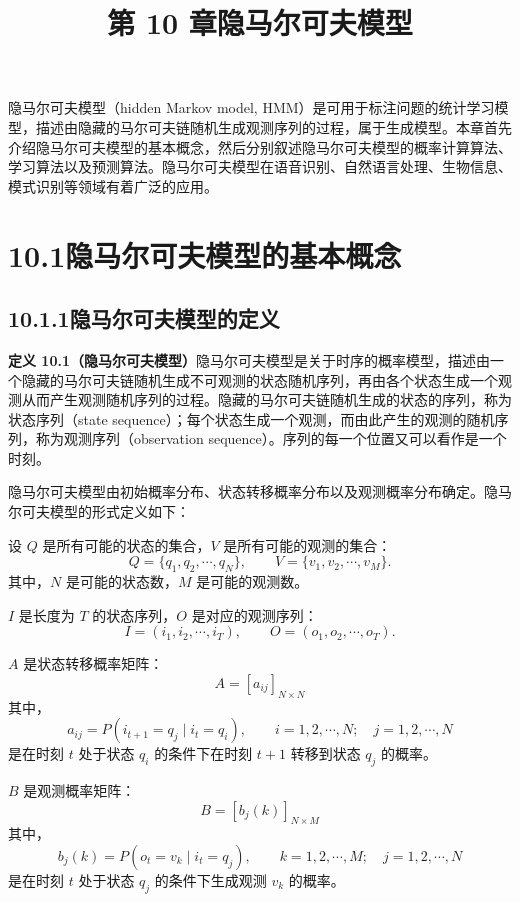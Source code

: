 \documentclass[UTF8,12pt,a4paper,fontset=fandol]{ctexart}
\title{第 10 章\quad 隐马尔可夫模型}
\author{}
\date{}
\begin{document}
\maketitle

隐马尔可夫模型（hidden Markov model, HMM）是可用于标注问题的统计学习模型，描述由隐藏的马尔可夫链随机生成观测序列的过程，属于生成模型。本章首先介绍隐马尔可夫模型的基本概念，然后分别叙述隐马尔可夫模型的概率计算算法、学习算法以及预测算法。隐马尔可夫模型在语音识别、自然语言处理、生物信息、模式识别等领域有着广泛的应用。

\section*{10.1\quad 隐马尔可夫模型的基本概念}

\subsection*{10.1.1\quad 隐马尔可夫模型的定义}

\noindent\textbf{定义 10.1（隐马尔可夫模型）}\quad 隐马尔可夫模型是关于时序的概率模型，描述由一个隐藏的马尔可夫链随机生成不可观测的状态随机序列，再由各个状态生成一个观测从而产生观测随机序列的过程。隐藏的马尔可夫链随机生成的状态的序列，称为状态序列（state sequence）；每个状态生成一个观测，而由此产生的观测的随机序列，称为观测序列（observation sequence）。序列的每一个位置又可以看作是一个时刻。

隐马尔可夫模型由初始概率分布、状态转移概率分布以及观测概率分布确定。隐马尔可夫模型的形式定义如下：

设 $Q$ 是所有可能的状态的集合，$V$ 是所有可能的观测的集合：
\[
  Q=\{q_1,q_2,\cdots,q_N\},\qquad
  V=\{v_1,v_2,\cdots,v_M\}.
\]
其中，$N$ 是可能的状态数，$M$ 是可能的观测数。

$I$ 是长度为 $T$ 的状态序列，$O$ 是对应的观测序列：
\[
  I=(i_1,i_2,\cdots,i_T),\qquad
  O=(o_1,o_2,\cdots,o_T).
\]

$A$ 是状态转移概率矩阵：
\begin{equation}
  A=[a_{ij}]_{N\times N}
  \tag{10.1}
\end{equation}
其中，
\begin{equation}
  a_{ij}=P(i_{t+1}=q_j\mid i_t=q_i),\qquad
  i=1,2,\cdots,N;\quad j=1,2,\cdots,N
  \tag{10.2}
\end{equation}
是在时刻 $t$ 处于状态 $q_i$ 的条件下在时刻 $t+1$ 转移到状态 $q_j$ 的概率。

$B$ 是观测概率矩阵：
\begin{equation}
  B=[b_j(k)]_{N\times M}
  \tag{10.3}
\end{equation}
其中，
\begin{equation}
  b_j(k)=P(o_t=v_k\mid i_t=q_j),\qquad
  k=1,2,\cdots,M;\quad j=1,2,\cdots,N
  \tag{10.4}
\end{equation}
是在时刻 $t$ 处于状态 $q_j$ 的条件下生成观测 $v_k$ 的概率。
\end{document}

